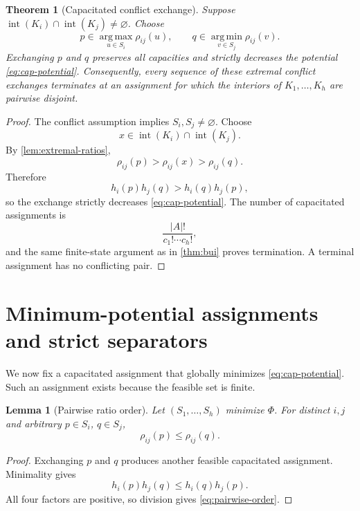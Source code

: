 \documentclass[final,5p,times,twocolumn]{elsarticle}
\newtheorem{theorem}{Theorem}[section]
\newtheorem{lemma}[lemma]{Lemma}
\theoremstyle{definition}
\theoremstyle{remark}
\newcommand{\interior}[1]{\operatorname{int}(#1)}
\newcommand{\height}{h}
\newcommand{\ratio}{\rho}
\newcommand{\Potential}{\Phi}
\begin{document}
\begin{theorem}[Capacitated conflict exchange]
\label{thm:cap-exchange}
Suppose $\interior{K_i}\cap\interior{K_j}\neq\varnothing$. Choose
\[
p\in\operatorname*{arg\,max}_{u\in S_i}\ratio_{ij}(u),
\qquad
q\in\operatorname*{arg\,min}_{v\in S_j}\ratio_{ij}(v).
\]
Exchanging $p$ and $q$ preserves all capacities and strictly decreases the potential \eqref{eq:cap-potential}. Consequently, every sequence of these extremal conflict exchanges terminates at an assignment for which the interiors of $K_1,\ldots,K_h$ are pairwise disjoint.
\end{theorem}

\begin{proof}
The conflict assumption implies $S_i,S_j\neq\varnothing$. Choose
\[
x\in\interior{K_i}\cap\interior{K_j}.
\]
By \cref{lem:extremal-ratios},
\[
\ratio_{ij}(p)>\ratio_{ij}(x)>\ratio_{ij}(q).
\]
Therefore
\[
\height_i(p)\height_j(q)>
\height_i(q)\height_j(p),
\]
so the exchange strictly decreases \eqref{eq:cap-potential}. The number of capacitated assignments is
\[
\frac{|A|!}{c_1!\cdots c_h!},
\]
and the same finite-state argument as in \cref{thm:bui} proves termination. A terminal assignment has no conflicting pair.
\end{proof}

\section{Minimum-potential assignments and strict separators}
\label{sec:separators}

We now fix a capacitated assignment that globally minimizes \eqref{eq:cap-potential}. Such an assignment exists because the feasible set is finite.

\begin{lemma}[Pairwise ratio order]
\label{lem:pairwise-order}
Let $(S_1,\ldots,S_h)$ minimize $\Potential$. For distinct $i,j$ and arbitrary $p\in S_i$, $q\in S_j$,
\begin{equation}
\ratio_{ij}(p)\leq\ratio_{ij}(q).
\label{eq:pairwise-order}
\end{equation}
\end{lemma}

\begin{proof}
Exchanging $p$ and $q$ produces another feasible capacitated assignment. Minimality gives
\[
\height_i(p)\height_j(q)
\leq
\height_i(q)\height_j(p).
\]
All four factors are positive, so division gives \eqref{eq:pairwise-order}.
\end{proof}
\end{document}
